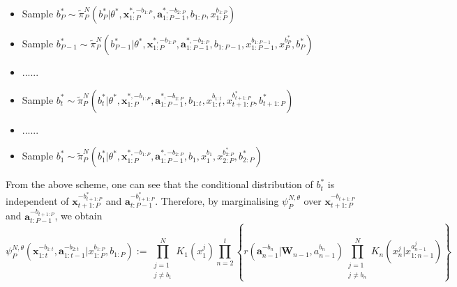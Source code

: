 \documentclass[12pt,a4paper]{article}
\begin{document}
\begin{itemize}
    \item Sample \(b_P^{*} \sim \tilde{\pi}_P^{N}(b_P^{*}|\theta^{*},\textbf{x}_{1:P}^{*,-b_{1:P}},\textbf{a}_{1:P-1}^{*,-b_{2:P}},b_{1:P},x_{1:P}^{b_{1:P}})\)
    \item Sample \(b_{P-1}^{*} \sim \tilde{\pi}_P^{N}(b_{P-1}^{*}|\theta^{*},\textbf{x}_{1:P}^{*,-b_{1:P}},\textbf{a}_{1:P-1}^{*,-b_{2:P}},b_{1:P-1},x_{1:P-1}^{b_{1:P-1}},x_P^{b_P^{*}},b_{P}^{*})\)
    \item ......
    \item Sample \(b_{t}^{*} \sim \tilde{\pi}_P^{N}(b_{t}^{*}|\theta^{*},\textbf{x}_{1:P}^{*,-b_{1:P}},\textbf{a}_{1:P-1}^{*,-b_{2:P}},b_{1:t},x_{1:t}^{b_{1:t}},x_{t+1:P}^{b_{t+1:P}^{*}},b_{t+1:P}^{*})\)
    \item ......
    \item Sample \(b_{1}^{*} \sim \tilde{\pi}_P^{N}(b_{1}^{*}|\theta^{*},\textbf{x}_{1:P}^{*,-b_{1:P}},\textbf{a}_{1:P-1}^{*,-b_{2:P}},b_{1},x_{1}^{b_{1}},x_{2:P}^{b_{2:P}^{*}},b_{2:P}^{*})\)
\end{itemize}
From the above scheme, one can see that the conditional distribution of $b_t^{*}$ is independent of \(\mathbf{x}_{t+1:P}^{-b_{t+1:P}^{*}}\) and \(\mathbf{a}_{t:P-1}^{-b_{t+1:P}^{*}}\). Therefore, by marginalising \(\psi_{P}^{N,\theta}\) over \(\mathbf{x}_{t+1:P}^{-b_{t+1:P}}\) and \(\mathbf{a}_{t:P-1}^{-b_{t+1:P}}\), we obtain 
\begin{equation}
    \label{PMCMC-Marginal of psi}
    \psi_{P}^{N,\theta}(\mathbf{x}_{1:t}^{-b_{1:t}},\mathbf{a}_{1:t-1}^{-b_{2:t}}|x_{1:P}^{b_{1:P}},b_{1:P}) := \prod_{\substack{j=1\\j \neq b_1}}^{N} K_1\left(x_1^j\right)\prod_{n=2}^t \left\{r\left(\mathbf{a}_{n-1}^{-b_{n}}|\mathbf{W}_{n-1},a_{n-1}^{b_n}\right)\prod_{\substack{j=1\\ j \neq b_n}}^{N} K_n(x_n^j|x_{1:n-1}^{a_{n-1}^j})\right\}
\end{equation}
\end{document}
